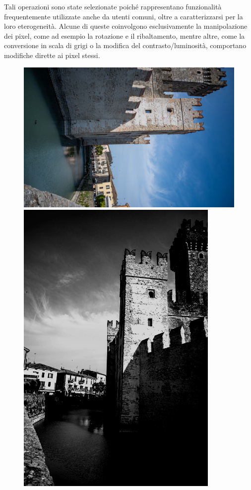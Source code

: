 Tali operazioni sono state selezionate poiché rappresentano funzionalità frequentemente utilizzate anche da utenti comuni, oltre a caratterizzarsi per la loro eterogeneità. Alcune di queste coinvolgono esclusivamente la manipolazione dei pixel, come ad esempio la rotazione e il ribaltamento, mentre altre, come la conversione in scala di grigi o la modifica del contrasto/luminosità, comportano modifiche dirette ai pixel stessi.
\begin{figure}
    \centering
    \begin{minipage}{.5\textwidth}
      \centering
      \includegraphics[width=.7\linewidth]{images/pre.jpeg}
    \end{minipage}%
    \begin{minipage}{.5\textwidth}
      \centering
      \includegraphics[width=1\linewidth]{images/post.jpg}

\end{minipage}
\end{figure}
